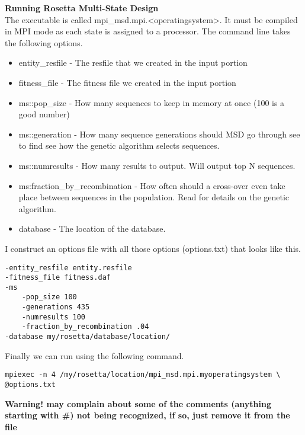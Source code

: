 \textbf{Running Rosetta Multi-State Design} \\
The \rosetta executable is called mpi\_msd.mpi.<operatingsystem>. It must be compiled in MPI mode as each state is assigned to a processor. The command line takes the following options.

\begin{itemize}
\item entity\_resfile - The resfile that we created in the input portion
\item fitness\_file - The fitness file we created in the input portion
\item ms::pop\_size - How many sequences to keep in memory at once (100 is a good number)
\item ms::generation - How many sequence generations should MSD go through see \citep{LeaverFay:2011ji} to find see how the genetic algorithm selects sequences.
\item ms::numresults - How many results to output. Will output top N sequences.
\item ms:fraction\_by\_recombination - How often should a cross-over even take place between sequences in the population. Read \citep{LeaverFay:2011ji} for details on the genetic algorithm.
\item database - The location of the database.
\end{itemize}

I construct an options file with all those options (options.txt) that looks like this.

\begin{verbatim}
-entity_resfile entity.resfile
-fitness_file fitness.daf
-ms
    -pop_size 100
    -generations 435
    -numresults 100
    -fraction_by_recombination .04
-database my/rosetta/database/location/
\end{verbatim}

Finally we can run \rosetta using the following command.

\begin{verbatim}
mpiexec -n 4 /my/rosetta/location/mpi_msd.mpi.myoperatingsystem \
@options.txt
\end{verbatim}
\textbf{Warning! \linebreak \rosetta may complain about some of the comments (anything starting with \#) not being recognized, if so, just remove it from the file}
